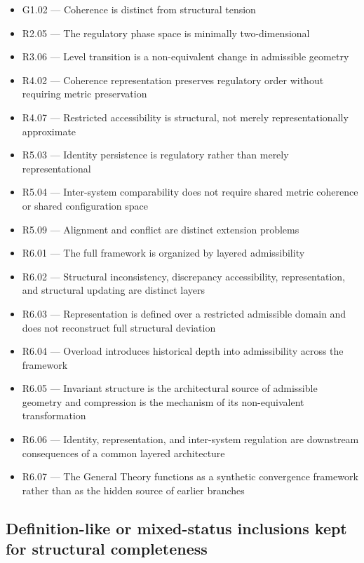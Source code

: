 \documentclass[12pt]{article}
\begin{document}
	\begin{itemize}[leftmargin=2em]
		\item G1.02 --- Coherence is distinct from structural tension
		\item R2.05 --- The regulatory phase space is minimally two-dimensional
		\item R3.06 --- Level transition is a non-equivalent change in admissible geometry
		\item R4.02 --- Coherence representation preserves regulatory order without requiring metric preservation
		\item R4.07 --- Restricted accessibility is structural, not merely representationally approximate
		\item R5.03 --- Identity persistence is regulatory rather than merely representational
		\item R5.04 --- Inter-system comparability does not require shared metric coherence or shared configuration space
		\item R5.09 --- Alignment and conflict are distinct extension problems
		\item R6.01 --- The full framework is organized by layered admissibility
		\item R6.02 --- Structural inconsistency, discrepancy accessibility, representation, and structural updating are distinct layers
		\item R6.03 --- Representation is defined over a restricted admissible domain and does not reconstruct full structural deviation
		\item R6.04 --- Overload introduces historical depth into admissibility across the framework
		\item R6.05 --- Invariant structure is the architectural source of admissible geometry and compression is the mechanism of its non-equivalent transformation
		\item R6.06 --- Identity, representation, and inter-system regulation are downstream consequences of a common layered architecture
		\item R6.07 --- The General Theory functions as a synthetic convergence framework rather than as the hidden source of earlier branches
	\end{itemize}
	
	\subsection{Definition-like or mixed-status inclusions kept for structural completeness}
	
\end{document}
